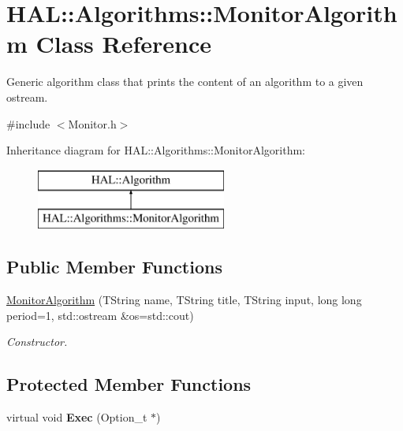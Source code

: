 \hypertarget{class_h_a_l_1_1_algorithms_1_1_monitor_algorithm}{\section{H\+A\+L\+:\+:Algorithms\+:\+:Monitor\+Algorithm Class Reference}
\label{class_h_a_l_1_1_algorithms_1_1_monitor_algorithm}
}


Generic algorithm class that prints the content of an algorithm to a given ostream.  




{\ttfamily \#include $<$Monitor.\+h$>$}

Inheritance diagram for H\+A\+L\+:\+:Algorithms\+:\+:Monitor\+Algorithm\+:\begin{figure}[H]
\begin{center}
\leavevmode
\includegraphics[height=2.000000cm]{class_h_a_l_1_1_algorithms_1_1_monitor_algorithm}
\end{center}
\end{figure}
\subsection*{Public Member Functions}
\begin{DoxyCompactItemize}
\item 
\hyperlink{class_h_a_l_1_1_algorithms_1_1_monitor_algorithm_ac37ea6c50b23dbb49b63d9fe551554a7}{Monitor\+Algorithm} (T\+String name, T\+String title, T\+String input, long long period=1, std\+::ostream \&os=std\+::cout)
\begin{DoxyCompactList}\small\item\em Constructor. \end{DoxyCompactList}\end{DoxyCompactItemize}
\subsection*{Protected Member Functions}
\begin{DoxyCompactItemize}
\item 
\hypertarget{class_h_a_l_1_1_algorithms_1_1_monitor_algorithm_ae1efc679e7dcbc8692a6b37dca0517c3}{virtual void {\bfseries Exec} (Option\+\_\+t $\ast$)}\label{class_h_a_l_1_1_algorithms_1_1_monitor_algorithm_ae1efc679e7dcbc8692a6b37dca0517c3}

\end{DoxyCompactItemize}
